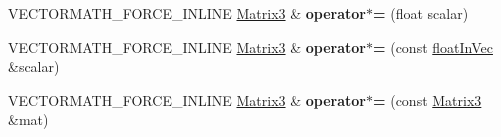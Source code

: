 \begin{DoxyCompactItemize}
\item 
\mbox{\label{classVectormath_1_1Aos_1_1Matrix3_a65e3b2b09e5c1b02a9252cd929583c1e}} 
V\+E\+C\+T\+O\+R\+M\+A\+T\+H\+\_\+\+F\+O\+R\+C\+E\+\_\+\+I\+N\+L\+I\+NE \hyperlink{classVectormath_1_1Aos_1_1Matrix3}{Matrix3} \& {\bfseries operator$\ast$=} (float scalar)
\item 
\mbox{\label{classVectormath_1_1Aos_1_1Matrix3_a5d14a5614964d706d0f428f594360194}} 
V\+E\+C\+T\+O\+R\+M\+A\+T\+H\+\_\+\+F\+O\+R\+C\+E\+\_\+\+I\+N\+L\+I\+NE \hyperlink{classVectormath_1_1Aos_1_1Matrix3}{Matrix3} \& {\bfseries operator$\ast$=} (const \hyperlink{classVectormath_1_1floatInVec}{float\+In\+Vec} \&scalar)
\item 
\mbox{\label{classVectormath_1_1Aos_1_1Matrix3_a73b9c8c48d0f0039582e3f806338173e}} 
V\+E\+C\+T\+O\+R\+M\+A\+T\+H\+\_\+\+F\+O\+R\+C\+E\+\_\+\+I\+N\+L\+I\+NE \hyperlink{classVectormath_1_1Aos_1_1Matrix3}{Matrix3} \& {\bfseries operator$\ast$=} (const \hyperlink{classVectormath_1_1Aos_1_1Matrix3}{Matrix3} \&mat)
\end{DoxyCompactItemize}
